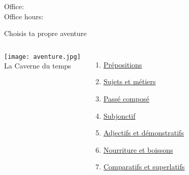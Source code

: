 \documentclass{beamer}
\subtitle[Révision: Examen 2]{Révision de l'examen 2}
\begin{document}
  \begin{frame}
    \titlepage
    \tiny{Office: \\
          Office hours: }
  \end{frame}

  \begin{frame}{Choisis ta propre aventure \\ }
    \hypertarget{début}{}
    \begin{columns}
        \begin{center}
          \texttt{[image: aventure.jpg]} \\
          La Caverne du temps
        \end{center}
        \begin{enumerate}
          \item \hyperlink{prépositions}{Prépositions}
          \item \hyperlink{sujets}{Sujets et métiers}
          
          \item \hyperlink{mort}{Passé composé}
          \item \hyperlink{mort}{Subjonctif}
          \item \hyperlink{adjectifs}{Adjectifs et démonstratifs}
          \item \hyperlink{mort}{Nourriture et boissons}
          \item \hyperlink{comparatifs}{Comparatifs et superlatifs}
        \end{enumerate}
    \end{columns}
  \end{frame}

\end{document}
